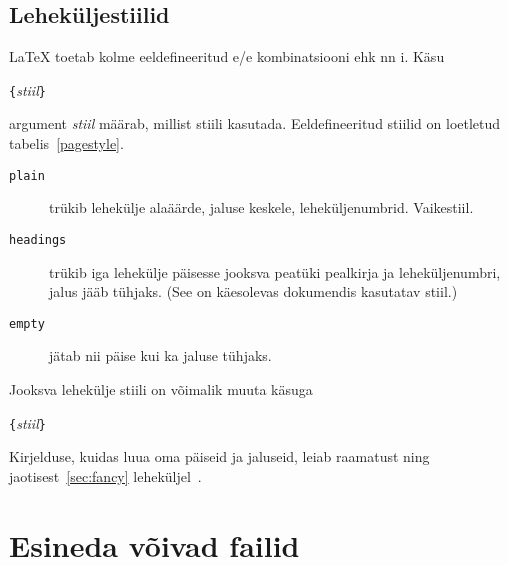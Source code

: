 {\subsection{Leheküljestiilid}

\LaTeX{} toetab kolme eeldefineeritud e/e
kombinatsiooni ehk nn i. Käsu
\begin{lscommand}
\verb|{|\emph{stiil}\verb|}|
\end{lscommand}
\noindent argument \emph{stiil} määrab, millist stiili kasutada.
Eeldefineeritud stiilid on loetletud tabelis~\ref{pagestyle}.

\begin{table}[tp]
\caption{\LaTeX i eeldefineeritud leheküljestiilid} \label{pagestyle}
\begin{lined}{\textwidth}
\begin{description}

\item[\normalfont\texttt{plain}] trükib lehekülje alaäärde, jaluse
keskele, leheküljenumbrid. Vaikestiil.

\item[\normalfont\texttt{headings}] trükib iga lehekülje päisesse
jooksva peatüki pealkirja ja leheküljenumbri, jalus jääb tühjaks. (See
on käesolevas dokumendis kasutatav stiil.)

\item[\normalfont\texttt{empty}] jätab nii päise kui ka jaluse tühjaks.

\end{description}
\end{lined}
\end{table}

Jooksva lehekülje stiili on võimalik muuta käsuga
\begin{lscommand}
\verb|{|\emph{stiil}\verb|}|
\end{lscommand}
Kirjelduse, kuidas luua oma päiseid ja jaluseid, leiab raamatust
\companion{} ning jaotisest~\ref{sec:fancy}
leheküljel~\pageref{sec:fancy}.
%
%

\section{Esineda võivad failid}

}

